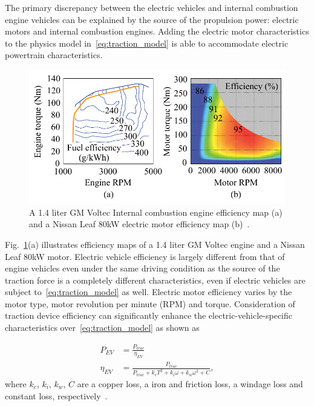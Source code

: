 The primary discrepancy between the electric vehicles and internal combustion engine vehicles can be explained by the source of the propulsion power: electric motors and internal combustion engines. Adding the electric motor characteristics to the physics model in~\eqref{eq:traction_model} is able to accommodate electric powertrain characteristics.

\begin{figure}
\centering
\includegraphics[width=1.0\hsize]{Figures/Naehyuck_Chang/motor_engine_torque_map.pdf}
\caption{A 1.4 liter GM Voltec Internal combustion engine efficiency map (a) and a Nissan Leaf 80kW electric motor efficiency map (b)~\cite{Nissan:SAE11, Grebe:ATZ11}.}
\label{fig:torque_map}
\end{figure}      

Fig.~\ref{fig:torque_map}(a) illustrates efficiency maps of a 1.4 liter GM Voltec engine and a Nissan Leaf 80kW motor. Electric vehicle efficiency is largely different from that of engine vehicles even under the same driving condition as the source of the traction force is a completely different characteristics, even if electric vehicles are subject to~\eqref{eq:traction_model} as well. Electric motor efficiency varies by the motor type, motor revolution per minute (RPM) and torque. Consideration of traction device efficiency can significantly enhance the electric-vehicle-specific characteristics over~\eqref{eq:traction_model} as shown as

\begin{align} \label{eq:motor_eff_model}
P_{EV} &= \frac{P_{trac}}{\eta_{EV}} \\
\eta_{EV} &= \frac{P_{trac}}{{P_{trac} + k_c T^2 + k_i \omega + k_w \omega^3 + C}}, \nonumber
\end{align}
%
where $k_c$, $k_i$, $k_w$, $C$ are a copper loss, a iron and friction loss, a windage loss and constant loss, respectively~\cite{Vaz:JPS14,Lin:CCA14,Oliva:PHM13,Kachroudi:TVT12}.


